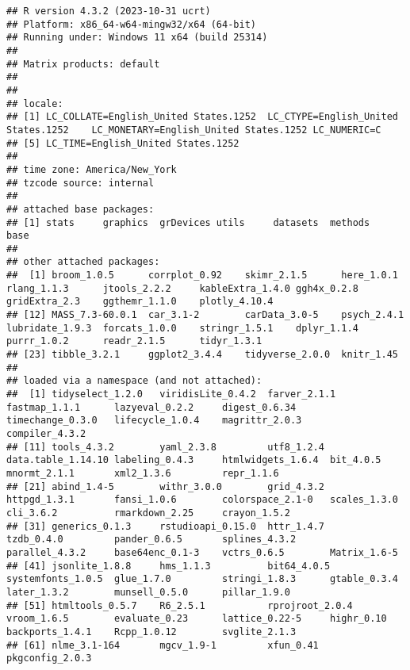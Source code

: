 \documentclass[
]{article}
\begin{document}
\begin{verbatim}
## R version 4.3.2 (2023-10-31 ucrt)
## Platform: x86_64-w64-mingw32/x64 (64-bit)
## Running under: Windows 11 x64 (build 25314)
## 
## Matrix products: default
## 
## 
## locale:
## [1] LC_COLLATE=English_United States.1252  LC_CTYPE=English_United States.1252    LC_MONETARY=English_United States.1252 LC_NUMERIC=C                          
## [5] LC_TIME=English_United States.1252    
## 
## time zone: America/New_York
## tzcode source: internal
## 
## attached base packages:
## [1] stats     graphics  grDevices utils     datasets  methods   base     
## 
## other attached packages:
##  [1] broom_1.0.5      corrplot_0.92    skimr_2.1.5      here_1.0.1       rlang_1.1.3      jtools_2.2.2     kableExtra_1.4.0 ggh4x_0.2.8      gridExtra_2.3    ggthemr_1.1.0    plotly_4.10.4   
## [12] MASS_7.3-60.0.1  car_3.1-2        carData_3.0-5    psych_2.4.1      lubridate_1.9.3  forcats_1.0.0    stringr_1.5.1    dplyr_1.1.4      purrr_1.0.2      readr_2.1.5      tidyr_1.3.1     
## [23] tibble_3.2.1     ggplot2_3.4.4    tidyverse_2.0.0  knitr_1.45      
## 
## loaded via a namespace (and not attached):
##  [1] tidyselect_1.2.0   viridisLite_0.4.2  farver_2.1.1       fastmap_1.1.1      lazyeval_0.2.2     digest_0.6.34      timechange_0.3.0   lifecycle_1.0.4    magrittr_2.0.3     compiler_4.3.2    
## [11] tools_4.3.2        yaml_2.3.8         utf8_1.2.4         data.table_1.14.10 labeling_0.4.3     htmlwidgets_1.6.4  bit_4.0.5          mnormt_2.1.1       xml2_1.3.6         repr_1.1.6        
## [21] abind_1.4-5        withr_3.0.0        grid_4.3.2         httpgd_1.3.1       fansi_1.0.6        colorspace_2.1-0   scales_1.3.0       cli_3.6.2          rmarkdown_2.25     crayon_1.5.2      
## [31] generics_0.1.3     rstudioapi_0.15.0  httr_1.4.7         tzdb_0.4.0         pander_0.6.5       splines_4.3.2      parallel_4.3.2     base64enc_0.1-3    vctrs_0.6.5        Matrix_1.6-5      
## [41] jsonlite_1.8.8     hms_1.1.3          bit64_4.0.5        systemfonts_1.0.5  glue_1.7.0         stringi_1.8.3      gtable_0.3.4       later_1.3.2        munsell_0.5.0      pillar_1.9.0      
## [51] htmltools_0.5.7    R6_2.5.1           rprojroot_2.0.4    vroom_1.6.5        evaluate_0.23      lattice_0.22-5     highr_0.10         backports_1.4.1    Rcpp_1.0.12        svglite_2.1.3     
## [61] nlme_3.1-164       mgcv_1.9-1         xfun_0.41          pkgconfig_2.0.3
\end{verbatim}
\end{document}

